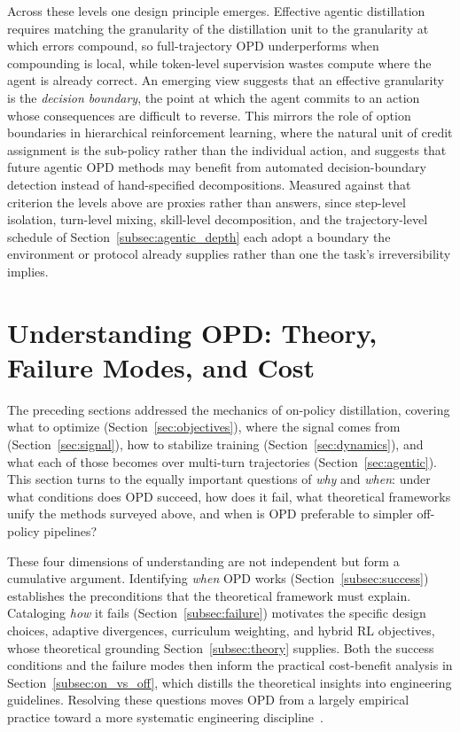\documentclass{article} %
\begin{document}
Across these levels one design principle emerges. Effective agentic distillation requires matching the granularity of the distillation unit to the granularity at which errors compound, so full-trajectory OPD underperforms when compounding is local, while token-level supervision wastes compute where the agent is already correct. An emerging view suggests that an effective granularity is the \emph{decision boundary}, the point at which the agent commits to an action whose consequences are difficult to reverse. This mirrors the role of option boundaries in hierarchical reinforcement learning, where the natural unit of credit assignment is the sub-policy rather than the individual action, and suggests that future agentic OPD methods may benefit from automated decision-boundary detection instead of hand-specified decompositions. Measured against that criterion the levels above are proxies rather than answers, since step-level isolation, turn-level mixing, skill-level decomposition, and the trajectory-level schedule of Section~\ref{subsec:agentic_depth} each adopt a boundary the environment or protocol already supplies rather than one the task's irreversibility implies.

\section{Understanding OPD: Theory, Failure Modes, and Cost}
\label{sec:understanding}

The preceding sections addressed the mechanics of on-policy distillation, covering what to optimize (Section~\ref{sec:objectives}), where the signal comes from (Section~\ref{sec:signal}), how to stabilize training (Section~\ref{sec:dynamics}), and what each of those becomes over multi-turn trajectories (Section~\ref{sec:agentic}). This section turns to the equally important questions of \emph{why} and \emph{when}: under what conditions does OPD succeed, how does it fail, what theoretical frameworks unify the methods surveyed above, and when is OPD preferable to simpler off-policy pipelines?

These four dimensions of understanding are not independent but form a cumulative argument. Identifying \emph{when} OPD works (Section~\ref{subsec:success}) establishes the preconditions that the theoretical framework must explain. Cataloging \emph{how} it fails (Section~\ref{subsec:failure}) motivates the specific design choices, adaptive divergences, curriculum weighting, and hybrid RL objectives, whose theoretical grounding Section~\ref{subsec:theory} supplies. Both the success conditions and the failure modes then inform the practical cost-benefit analysis in Section~\ref{subsec:on_vs_off}, which distills the theoretical insights into engineering guidelines. Resolving these questions moves OPD from a largely empirical practice toward a more systematic engineering discipline~\citep{2602.12222,2604.13016}.
\end{document}
